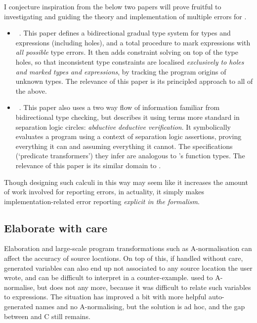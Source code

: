 I conjecture inspiration from the below two papers will prove fruitful
to investigating and guiding the theory and implementation of multiple
errors for .
\begin{itemize}
    \item {}~.
        This paper defines a bidirectional gradual
        type system for types and expressions (including holes), and a total
        procedure to mark expressions with \emph{all possible} type errors. It
        then adds constraint solving on top of the type holes, so that
        inconsistent type constraints are localised \emph{exclusively to holes
        and marked types and expressions}, by tracking the program origins of
        unknown types. The relevance of this paper is its principled approach
        to all of the above.
    \item {}~.
        This paper also uses a two way flow of
        information familiar from bidirectional type checking, but describes it
        using terms more standard in separation logic circles: \emph{abductive
        deductive verification}. It symbolically evaluates a program using a
        context of separation logic assertions, proving everything it can and
        assuming everything it cannot. The specifications (`predicate
        transformers') they infer are analogous to 's function types.
        The relevance of this paper is its similar domain to .
\end{itemize}
Though designing such calculi in this way may seem like it increases the amount
of work involved for reporting errors, in actuality, it simply makes
implementation-related error reporting \emph{explicit in the formalism}.

\subsection{Elaborate with care}

Elaboration and large-scale program transformations such as A-normalisation can
affect the accuracy of source locations. On top of this, if handled without
care, generated variables can also end up not associated to any source location
the user wrote, and can be difficult to interpret in a counter-example. 
used to A-normalise, but does not any
more, because it was difficult to relate such variables to 
expressions. The situation has improved a bit with more helpful auto-generated
names and no A-normalising, but the solution is ad hoc, and the gap between
 and C still remains.

